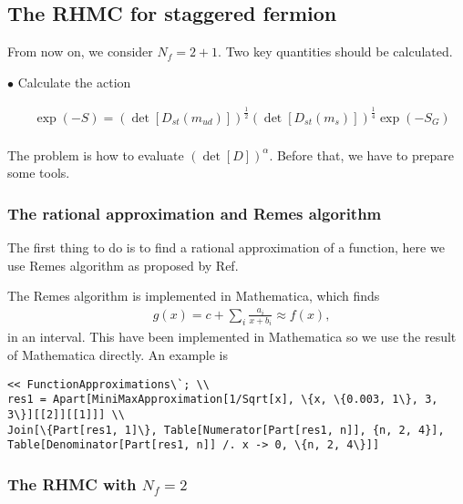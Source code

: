 \subsection{\label{sec:rhmc}The RHMC for staggered fermion}

From now on, we consider $N_f=2+1$. Two key quantities should be calculated.

$\bullet$ Calculate the action

\begin{equation}
\begin{split}
&\exp(-S)=\left(\det [D_{st}(m_{ud})]\right)^{\frac{1}{2}}\left(\det [D_{st}(m_s)]\right)^{\frac{1}{4}} \exp (-S_G)\\
\end{split}
\end{equation}

The problem is how to evaluate $\left(\det [D]\right)^{\alpha}$. Before that, we have to prepare some tools.

\subsubsection{\label{sec:rationalapproximation}The rational approximation and Remes algorithm}

The first thing to do is to find a rational approximation of a function, here we use Remes algorithm as proposed by Ref.~\cite{staggeredRHMC}

The Remes algorithm is implemented in Mathematica, which finds
\begin{equation}
\begin{split}
&g(x)=c+\sum _i \frac{a_i}{x+b_i}\approx f(x),
\end{split}
\end{equation}
in an interval. This have been implemented in Mathematica so we use the result of Mathematica directly. An example is
\begin{lstlisting}
<< FunctionApproximations\`; \\
res1 = Apart[MiniMaxApproximation[1/Sqrt[x], \{x, \{0.003, 1\}, 3, 3\}][[2]][[1]]] \\
Join[\{Part[res1, 1]\}, Table[Numerator[Part[res1, n]], {n, 2, 4}], Table[Denominator[Part[res1, n]] /. x -> 0, \{n, 2, 4\}]]
\end{lstlisting}

\subsubsection{\label{sec:hmcofrhmc}The RHMC with \texorpdfstring{$N_f=2$}{Nf=2}}

